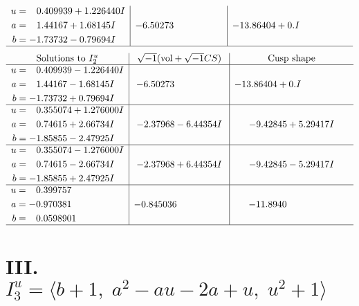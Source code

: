 \documentclass[1p]{elsarticle_modified}
\theoremstyle{definition}
\newcommand{\I}{\sqrt{-1}}
\begin{document}
$$\begin{array}{c|c|c}
\begin{aligned}
u &= \phantom{-}0.409939 + 1.226440 I \\
a &= \phantom{-}1.44167 + 1.68145 I \\
b &= -1.73732 - 0.79694 I\end{aligned}
 & -6.50273\phantom{ +0.000000I} & -13.86404 + 0. I\phantom{ +0.000000I}\\
 \hline 
 \end{array}$$\newpage$$\begin{array}{c|c|c}  
\text{Solutions to }I^u_{2}& \I (\text{vol} + \sqrt{-1}CS) & \text{Cusp shape}\\
 \hline 
\begin{aligned}
u &= \phantom{-}0.409939 - 1.226440 I \\
a &= \phantom{-}1.44167 - 1.68145 I \\
b &= -1.73732 + 0.79694 I\end{aligned}
 & -6.50273\phantom{ +0.000000I} & -13.86404 + 0. I\phantom{ +0.000000I} \\ \hline\begin{aligned}
u &= \phantom{-}0.355074 + 1.276000 I \\
a &= \phantom{-}0.74615 + 2.66734 I \\
b &= -1.85855 - 2.47925 I\end{aligned}
 & -2.37968 - 6.44354 I & -9.42845 + 5.29417 I \\ \hline\begin{aligned}
u &= \phantom{-}0.355074 - 1.276000 I \\
a &= \phantom{-}0.74615 - 2.66734 I \\
b &= -1.85855 + 2.47925 I\end{aligned}
 & -2.37968 + 6.44354 I & -9.42845 - 5.29417 I \\ \hline\begin{aligned}
u &= \phantom{-}0.399757\phantom{ +0.000000I} \\
a &= -0.970381\phantom{ +0.000000I} \\
b &= \phantom{-}0.0598901\phantom{ +0.000000I}\end{aligned}
 & -0.845036\phantom{ +0.000000I} & -11.8940\phantom{ +0.000000I}\\
 \hline 
 \end{array}$$\newpage\newpage\renewcommand{\arraystretch}{1}
\centering \section*{III. $I^u_{3}= \langle b+1,\;a^2- a u-2 a+u,\;u^2+1 \rangle$}
\end{document}
